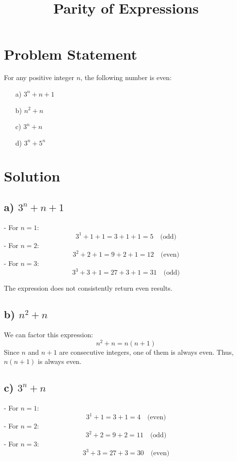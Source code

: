 \documentclass{article}
\begin{document}
\title{Parity of Expressions}
\author{}
\date{}
\maketitle

\section{Problem Statement}

For any positive integer \( n \), the following number is even:
\begin{enumerate}
\item[a)] \( 3^n + n + 1 \)
\item[b)] \( n^2 + n \)
\item[c)] \( 3^n + n \)
\item[d)] \( 3^n + 5^n \)
\end{enumerate}

\section{Solution}

\subsection{a) \( 3^n + n + 1 \)}

- For \( n = 1 \):
\[
3^1 + 1 + 1 = 3 + 1 + 1 = 5 \quad \text{(odd)}
\]
- For \( n = 2 \):
\[
3^2 + 2 + 1 = 9 + 2 + 1 = 12 \quad \text{(even)}
\]
- For \( n = 3 \):
\[
3^3 + 3 + 1 = 27 + 3 + 1 = 31 \quad \text{(odd)}
\]

The expression does not consistently return even results.

\subsection{b) \( n^2 + n \)}

We can factor this expression:
\[
n^2 + n = n(n + 1)
\]
Since \( n \) and \( n + 1 \) are consecutive integers, one of them is always even. Thus, \( n(n + 1) \) is always even.

\subsection{c) \( 3^n + n \)}

- For \( n = 1 \):
\[
3^1 + 1 = 3 + 1 = 4 \quad \text{(even)}
\]
- For \( n = 2 \):
\[
3^2 + 2 = 9 + 2 = 11 \quad \text{(odd)}
\]
- For \( n = 3 \):
\[
3^3 + 3 = 27 + 3 = 30 \quad \text{(even)}
\]
\end{document}
